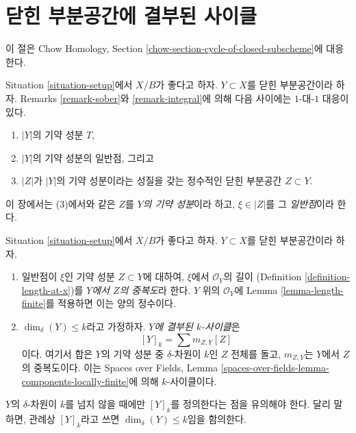 \section{닫힌 부분공간에 결부된 사이클}
\label{section-cycle-of-closed-subscheme}

\noindent
이 절은 Chow Homology, Section
\ref{chow-section-cycle-of-closed-subscheme}에 대응한다.

\begin{remark}
\label{remark-irreducible-component}
Situation \ref{situation-setup}에서 $X/B$가 좋다고 하자.
$Y \subset X$를 닫힌 부분공간이라 하자. Remarks
\ref{remark-sober}와 \ref{remark-integral}에 의해 다음 사이에는
$1$-대-$1$ 대응이 있다.
\begin{enumerate}
\item $|Y|$의 기약 성분 $T$,
\item $|Y|$의 기약 성분의 일반점, 그리고
\item $|Z|$가 $|Y|$의 기약 성분이라는 성질을 갖는 정수적인 닫힌
부분공간 $Z \subset Y$.
\end{enumerate}
이 장에서는 (3)에서와 같은 $Z$를 {\it $Y$의 기약 성분}이라 하고,
$\xi \in |Z|$를 그 {\it 일반점}이라 한다.
\end{remark}

\begin{definition}
\label{definition-cycle-associated-to-closed-subscheme}
Situation \ref{situation-setup}에서 $X/B$가 좋다고 하자.
$Y \subset X$를 닫힌 부분공간이라 하자.
\begin{enumerate}
\item 일반점이 $\xi$인 기약 성분 $Z \subset Y$에 대하여,
$\xi$에서 $\mathcal{O}_Y$의 길이
(Definition \ref{definition-length-at-x})를
{\it $Y$에서 $Z$의 중복도}라 한다.
$Y$ 위의 $\mathcal{O}_Y$에 Lemma \ref{lemma-length-finite}를 적용하면
이는 양의 정수이다.
\item $\dim_\delta(Y) \leq k$라고 가정하자.
{\it $Y$에 결부된 $k$-사이클}은
$$
[Y]_k = \sum m_{Z, Y}[Z]
$$
이다. 여기서 합은 $Y$의 기약 성분 중 $\delta$-차원이 $k$인
$Z$ 전체를 돌고, $m_{Z, Y}$는 $Y$에서 $Z$의 중복도이다.
이는 Spaces over Fields, Lemma
\ref{spaces-over-fields-lemma-components-locally-finite}에 의해
$k$-사이클이다.
\end{enumerate}
\end{definition}

\noindent
$Y$의 $\delta$-차원이 $k$를 넘지 않을 때에만 $[Y]_k$를 정의한다는
점을 유의해야 한다. 달리 말하면, 관례상 $[Y]_k$라고 쓰면
$\dim_\delta(Y) \leq k$임을 함의한다.






